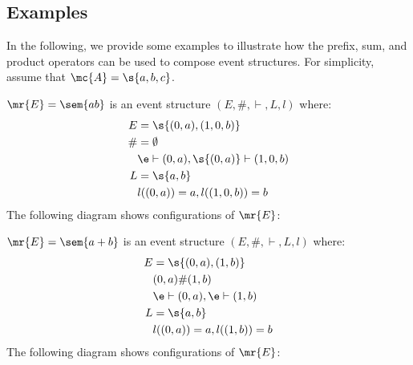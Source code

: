 \subsection{Examples}
In the following, we provide some examples to illustrate
how the prefix, sum, and product operators can be used to 
compose event structures.
For simplicity, assume that $ \mc{A} = \s{a,b,c}$. 

\begin{example}
    $\mr{E} = \sem{ab}$ is an event structure
    $(E,\#,\vdash,L,l)$ where:
    \begin{align*}
        E  & = \s{(0,a),(1,0,b)}                       \\
        \# & = \emptyset                               \\
           & \e \vdash (0,a), \s{(0,a)} \vdash (1,0,b) \\
        L  & = \s{a,b}                                 \\
           & l((0,a)) = a, l((1,0,b)) = b              
    \end{align*}
    The following diagram shows configurations of $\mr{E}$:
    \begin{center}
    \end{center}
\end{example}

\begin{example}
    $\mr{E} = \sem{a + b}$ is an event structure
    $(E,\#,\vdash,L,l)$ where:
    \begin{align*}
        E & = \s{(0,a),(1,b)}                \\
          & (0,a) \# (1,b)   \\
          & \e \vdash (0,a), \e \vdash (1,b) \\
        L & = \s{a,b}                        \\
          & l((0,a)) = a, l((1,b)) = b       
    \end{align*}
    The following diagram shows configurations of $\mr{E}$:
    \begin{center}
    \end{center}
\end{example}


